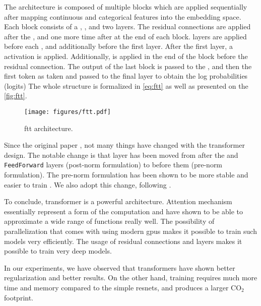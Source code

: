 The architecture is composed of multiple blocks which are applied sequentially after mapping continuous and categorical
features into the embedding space. Each block consists of a \LayerNorm, \MHA, and two \Linear
layers. The residual connections are applied after the \MHA, and one more time after at the end of each block.
\LayerNorm layers are applied before each \MHA, and additionally before the first \Linear layer. After the first \Linear
layer, a \GELU activation is applied. Additionally, \Dropout is applied in the end of the block before the residual
connection. The output of the last block is passed to the \LayerNorm, and then the first token as taken and passed to the
final \Linear layer to obtain the log probabilities (logits) The whole structure is formalized in
\autoref{eq:ftt} as well as presented on the \autoref{fig:ftt}.


\begin{figure}[htb]
    \centering
    \texttt{[image: figures/ftt.pdf]} \caption{\gls{ftt} architecture.}
    \label{fig:ftt}
\end{figure}


Since the original paper \cite{transformer}, not many things have changed with the transformer design. The notable
change is that \LayerNorm layer has been moved from after the \MHA and \texttt{FeedForward} layers
(post-norm formulation) to before them (pre-norm formulation). The pre-norm formulation has been shown to be more stable
and easier to train \cite{pre-norm}. We also adopt this change, following \cite{ft-transformer}.

To conclude, transformer is a powerful architecture. Attention mechanism essentially represent a form of the
computation and have shown to be able to approximate a wide range of functions really well. The possibility of
parallelization that comes with using modern \gls{gpu}s makes it possible to train such models very efficiently. The usage
of residual connections and \LayerNorm layers makes it possible to train very deep models.

In our experiments, we have observed that transformers have shown better regularization and better results. On the other
hand, training requires much more time and memory compared to the simple \glspl{resnet}, and produces a larger
$\text{CO}_2$ footprint.%

